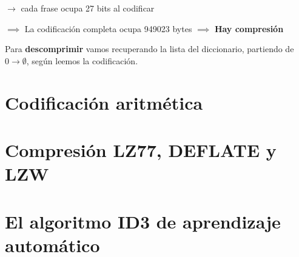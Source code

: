 $\rightarrow$  cada frase ocupa 27 bits al codificar

$\implies$ La codificación completa ocupa 949023 bytes $\implies$ \textbf{Hay compresión}

Para \textbf{descomprimir} vamos recuperando la lista del diccionario, partiendo de $0 \rightarrow \emptyset$, según leemos la codificación.


\section{Codificación aritmética}
\section{Compresión LZ77, DEFLATE y LZW}
\section{El algoritmo ID3 de aprendizaje automático}


